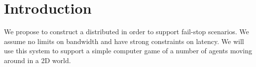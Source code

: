 
\section{Introduction}
\label{sec:Intro}


We propose to construct a distributed \clientServer in order to support fail-stop scenarios. We assume no limits on bandwidth and have strong constraints on latency. We will use this system to support a simple computer game of a number of agents moving around in a 2D world.

	


